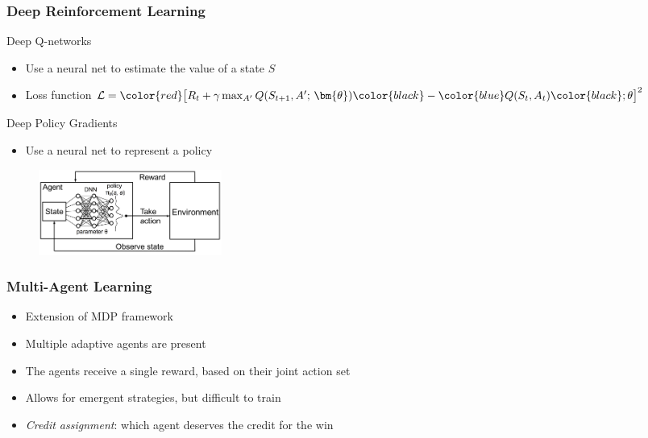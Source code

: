 \documentclass{beamer}
\begin{document}
\begin{frame}
\frametitle{Deep Reinforcement Learning}
\begin{block}{Deep Q-networks}
\begin{itemize}
    \item Use a neural net to estimate the value of a state $S$
    \item Loss function $\mathcal{L} = \color{red} \big [R_t + \gamma \max_{A'} Q(S_{t+1}, A';\, \bm{\theta}) \color{black} - \color{blue} Q(S_t, A_t) \color{black}; \theta \big ]^2$
\end{itemize}
\end{block}
\begin{block}{Deep Policy Gradients}
\begin{itemize}
    \item Use a neural net to represent a policy
\end{itemize}
\begin{figure}[htp]
    \centering
    \includegraphics[width=6cm]{images/deep_pg.png}
\end{figure}
\end{block}
\end{frame}

\begin{frame}
\frametitle{Multi-Agent Learning}
\begin{itemize}
    \item Extension of MDP framework
    \item Multiple adaptive agents are present
    \item The agents receive a single reward, based on their joint action set
    \item Allows for emergent strategies, but difficult to train
    \item \emph{Credit assignment}: which agent deserves the credit for the win
\end{itemize}
\end{frame}
\end{document}
